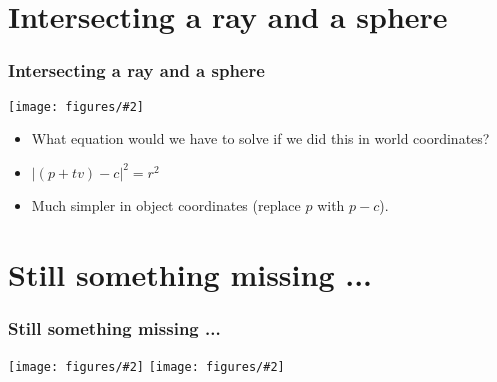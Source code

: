 \documentclass[slidestop,xcolor=pst]{beamer}
\newcommand{\mygraph}[2]{\texttt{[image: figures/\#2]}}
\newcommand{\sect}[1]{
\section{#1}
\begin{frame}[fragile]\frametitle{#1}
}
\begin{document}
\sect{Intersecting a ray and a sphere}
\mygraph{}{intersectingraysphere.png}
\begin{itemize}
  \item What equation would we have to solve if we did this in world
    coordinates? 
\pause
\item $|(p+tv) - c|^2 = r^2$
\item Much simpler in object coordinates (replace $p$ with $p-c$).
\end{itemize}
\end{frame}

\sect{Still something missing ...}
\mygraph{0.5}{threespheresflat.png}
\mygraph{0.5}{threespheres.png}

\end{frame}
\end{document}
